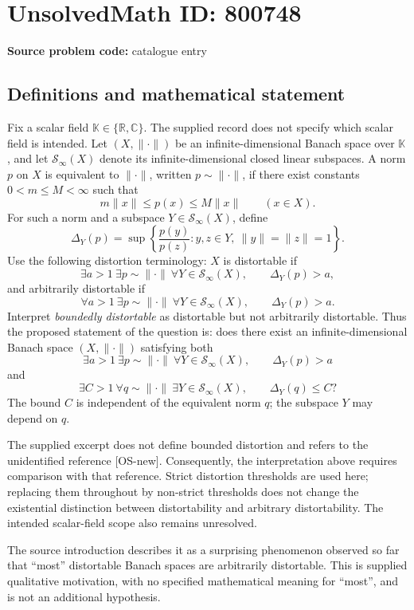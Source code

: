 \documentclass[11pt]{article}
\newcommand{\R}{\mathbb{R}}
\newcommand{\C}{\mathbb{C}}
\begin{document}
\section*{UnsolvedMath ID: 800748}
\textbf{Source problem code:} catalogue entry
\subsection{Definitions and mathematical statement}
Fix a scalar field \(\mathbb K\in\{\R,\C\}\). The supplied record does not specify which scalar field is intended. Let \((X,\|\cdot\|)\) be an infinite-dimensional Banach space over \(\mathbb K\), and let \(\mathcal S_\infty(X)\) denote its infinite-dimensional closed linear subspaces. A norm \(p\) on \(X\) is equivalent to \(\|\cdot\|\), written \(p\sim\|\cdot\|\), if there exist constants \(0<m\le M<\infty\) such that
\[
 m\|x\|\le p(x)\le M\|x\|\qquad(x\in X).
\]
For such a norm and a subspace \(Y\in\mathcal S_\infty(X)\), define
\[
 \Delta_Y(p)=\sup\left\{\frac{p(y)}{p(z)}:y,z\in Y,\ \|y\|=\|z\|=1\right\}.
\]
Use the following distortion terminology: \(X\) is distortable if
\[
 \exists a>1\ \exists p\sim\|\cdot\|\ \forall Y\in\mathcal S_\infty(X),\qquad \Delta_Y(p)>a,
\]
and arbitrarily distortable if
\[
 \forall a>1\ \exists p\sim\|\cdot\|\ \forall Y\in\mathcal S_\infty(X),\qquad \Delta_Y(p)>a.
\]
Interpret \emph{boundedly distortable} as distortable but not arbitrarily distortable. Thus the proposed statement of the question is: does there exist an infinite-dimensional Banach space \((X,\|\cdot\|)\) satisfying both
\[
 \exists a>1\ \exists p\sim\|\cdot\|\ \forall Y\in\mathcal S_\infty(X),\qquad \Delta_Y(p)>a
\]
and
\[
 \exists C>1\ \forall q\sim\|\cdot\|\ \exists Y\in\mathcal S_\infty(X),\qquad \Delta_Y(q)\le C?
\]
The bound \(C\) is independent of the equivalent norm \(q\); the subspace \(Y\) may depend on \(q\).

The supplied excerpt does not define bounded distortion and refers to the unidentified reference [OS-new]. Consequently, the interpretation above requires comparison with that reference. Strict distortion thresholds are used here; replacing them throughout by non-strict thresholds does not change the existential distinction between distortability and arbitrary distortability. The intended scalar-field scope also remains unresolved.

The source introduction describes it as a surprising phenomenon observed so far that ``most'' distortable Banach spaces are arbitrarily distortable. This is supplied qualitative motivation, with no specified mathematical meaning for ``most'', and is not an additional hypothesis.
\end{document}
